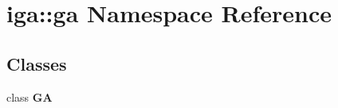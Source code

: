 \section{iga::ga Namespace Reference}
\label{namespaceiga_1_1ga}


\subsection*{Classes}
\begin{CompactItemize}
\item 
class {\bf GA}
\end{CompactItemize}
